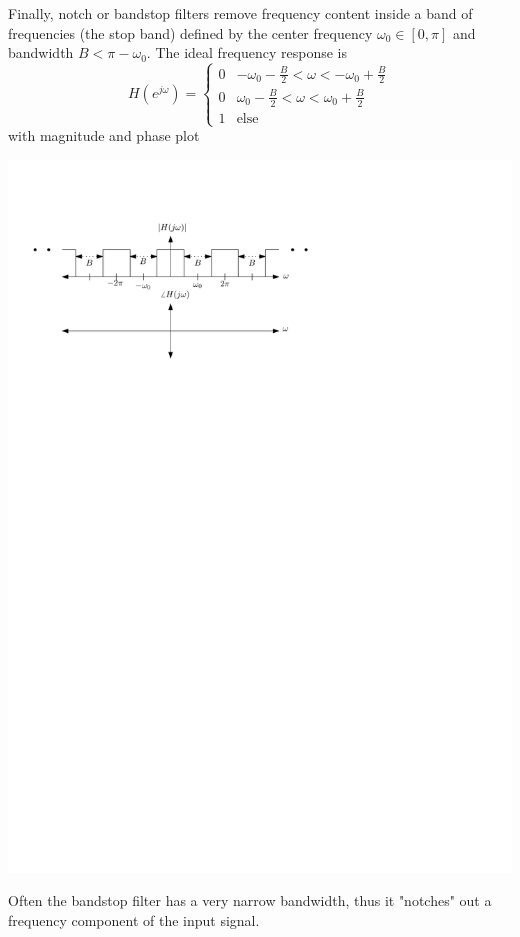 Finally, notch or bandstop filters remove frequency content inside a band of frequencies (the stop band) defined by the center frequency $\omega_0\in [0,\pi]$ and bandwidth $B < \pi-\omega_0$. The ideal frequency response is
\[
H\left(e^{j\omega}\right) = \left\{ \begin{array}{lc}
  0 & -\omega_0 - \frac{B}{2} < \omega < -\omega_0+\frac{B}{2}\\[1em]
  0 & \omega_0 -\frac{B}{2} < \omega < \omega_0+\frac{B}{2}\\[1em]
  1 & \text{else}
\end{array}
\right. 
\]
with magnitude and phase plot
\begin{center}
  \includegraphics[scale=1]{graphics/bandstop-ideal-dt.pdf}
\end{center}
Often the bandstop filter has a very narrow bandwidth, thus it "notches" out a frequency component of the input signal.

